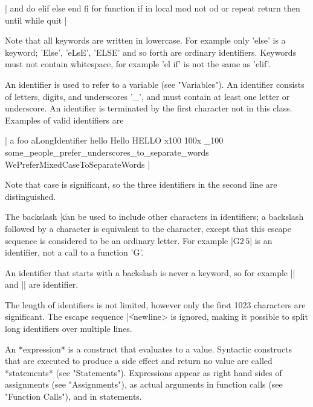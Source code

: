 |    and       do        elif      else      end       fi
    for       function  if        in        local     mod
    not       od        or        repeat    return    then
    until     while     quit |

Note that all keywords are written in lowercase.  For example only 'else'
is   a  keyword;  'Else', 'eLsE',  'ELSE'   and   so  forth  are ordinary
identifiers.  Keywords must not contain  whitespace, for  example 'el if'
is not the same as 'elif'.


An identifier is used to  refer to   a  variable (see  "Variables").   An
identifier consists of letters,  digits,  and underscores '\_',  and must
contain at least one letter  or underscore.   An identifier is terminated
by the first character not in this class.  Examples  of valid identifiers
are

|    a                   foo                 aLongIdentifier
    hello               Hello               HELLO
    x100                100x                _100
    some_people_prefer_underscores_to_separate_words
    WePreferMixedCaseToSeparateWords |

Note that  case  is  significant, so  the three identifiers in the second
line are distinguished.

The backslash |\| can be used to include other characters in identifiers;
a backslash  followed  by  a character  is equivalent   to the character,
except that this escape sequence  is considered to be an ordinary letter.
For example |G\(2\,5\)| is an identifier, not a call to a function 'G'.

An identifier that  starts with  a backslash is  never a  keyword, so for
example |\*| and |\mod| are identifier.

The length  of identifiers is not limited,   however only  the first 1023
characters are significant.  The escape sequence |\|<newline> is ignored,
making it possible to split long identifiers over multiple lines.

%

An  *expression* is a construct  that  evaluates  to a value.   Syntactic
constructs that are executed to produce a side effect and return no value
are called *statements*  (see "Statements").  Expressions appear as right
hand  sides of assignments  (see "Assignments"),  as  actual arguments in
function calls (see "Function Calls"), and in statements.

